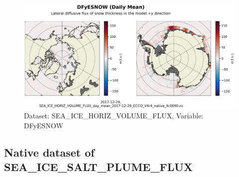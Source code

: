 \begin{figure}[H]
\centering
\includegraphics[scale=0.55]{../images/plots/native_plots/Sea-Ice_and_Snow_Horizontal_Volume_Fluxes/DFyESNOW.png}
\caption{Dataset: SEA\_ICE\_HORIZ\_VOLUME\_FLUX, Variable: DFyESNOW}
\label{tab:table-SEA_ICE_HORIZ_VOLUME_FLUX_DFyESNOW-Plot}
\end{figure}
\subsection{Native dataset of SEA\_ICE\_SALT\_PLUME\_FLUX}
\newp

